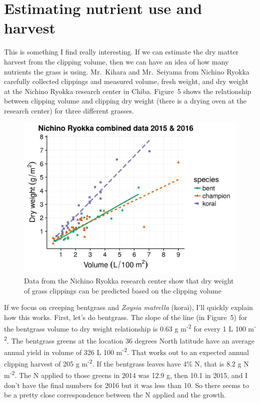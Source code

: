 \documentclass[12pt,b5,]{tufte-book}
\begin{document}
\hypertarget{estimating-nutrient-use-and-harvest}{%
\section{Estimating nutrient use and harvest}\label{estimating-nutrient-use-and-harvest}}

This is something I find really interesting. If we can estimate the dry
matter harvest from the clipping volume, then we can have an idea of how
many nutrients the grass is using. Mr.~Kihara and Mr.~Seiyama from
Nichino Ryokka carefully collected clippings and measured volume, fresh
weight, and dry weight at the Nichino Ryokka research center in Chiba.
Figure~5 shows the relationship between clipping volume
and clipping dry weight (there is a drying oven at the research center)
for three different grasses.

\begin{figure}
\centering
\includegraphics{figs/dryWeight.png}
\caption{Data from the Nichino Ryokka research center show that dry weight of
grass clippings can be predicted based on the clipping volume}
\end{figure}

If we focus on creeping bentgrass and \emph{Zoysia matrella} (korai), I'll
quickly explain how this works. First, let's do bentgrass. The slope of
the line (in Figure~5) for the bentgrass volume to dry
weight relationship is 0.63 g m\textsuperscript{-2} for every 1 L 100 m\textsuperscript{-2}. The
bentgrass greens at the location 36 degrees North latitude have an
average annual yield in volume of 326 L 100 m\textsuperscript{-2}. That works out to an
expected annual clipping harvest of 205 g m\textsuperscript{-2}. If the bentgrass leaves
have 4\% N, that is 8.2 g N m\textsuperscript{-2}. The N applied to those greens in 2014
was 12.9 g, then 10.1 in 2015, and I don't have the final numbers for
2016 but it was less than 10. So there seems to be a pretty close
correspondence between the N applied and the growth.
\end{document}
